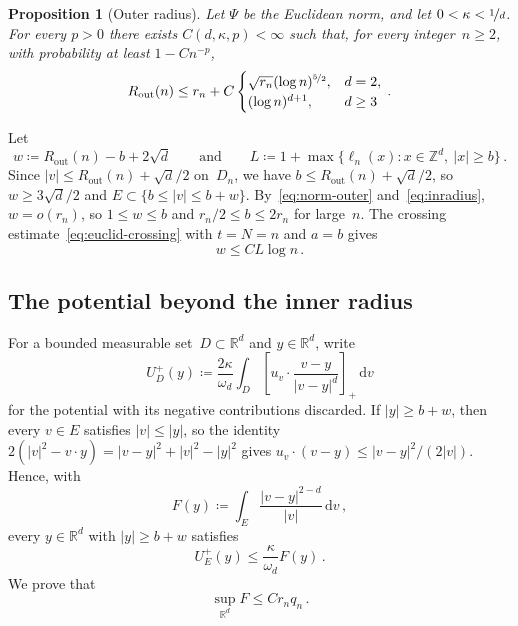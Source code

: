 \documentclass[11pt]{amsart}
\theoremstyle{plain}
\newtheorem{proposition}[theorem]{Proposition}
\theoremstyle{definition}
\newcommand{\Z}{\mathbb Z}
\newcommand{\R}{\mathbb R}
\newcommand{\drift}{\kappa}
\newcommand{\gauge}{\Psi}
\newcommand{\dd}{\,\mathrm d}
\newcommand{\nf}{\nicefrac}
\newcommand{\Rout}{R_{\mathrm{out}}}
\numberwithin{equation}{section}
\begin{document}
\begin{proposition}[Outer radius]\label{prop:stronger-outer}
Let $\gauge$ be the Euclidean norm, and let $0<\drift<\nf{1}{d}$. For every $p>0$ there exists $C(d,\drift,p)<\infty$ such that, for every integer~$n\geq2$, with probability at least $1-Cn^{-p}$,
\begin{equation*}
\Rout(n)\leq r_n+C\begin{cases}\sqrt{r_n}(\log n)^{\nf52},&d=2,\\(\log n)^{d+1},&d\geq3\end{cases}\, .
\end{equation*}
\end{proposition}

Let
\begin{equation*}
w\coloneqq\Rout(n)-b+2\sqrt d
\qquad\text{and}\qquad
L\coloneqq1+\max\{\ell_n(x):x\in\Z^d,\ |x|\geq b\}\, .
\end{equation*}
Since $|v|\leq\Rout(n)+\sqrt d/2$ on~$D_n$, we have $b\leq\Rout(n)+\sqrt d/2$, so $w\geq3\sqrt d/2$ and $E\subset\{b\leq|v|\leq b+w\}$. By~\eqref{eq:norm-outer} and~\eqref{eq:inradius}, $w=o(r_n)$, so $1\leq w\leq b$ and $r_n/2\leq b\leq2r_n$ for large~$n$. The crossing estimate~\eqref{eq:euclid-crossing} with $t=N=n$ and $a=b$ gives
\begin{equation}\label{eq:outer-width-occupation}
w\leq CL\log n\, .
\end{equation}

\subsection{The potential beyond the inner radius}\label{sec:outer-potential}

For a bounded measurable set~$D\subset\R^d$ and $y\in\R^d$, write
\begin{equation*}
U_D^+(y)\coloneqq\frac{2\drift}{\omega_d}\int_D\left[u_v\cdot\frac{v-y}{|v-y|^d}\right]_+\dd v
\end{equation*}
for the potential with its negative contributions discarded. If $|y|\geq b+w$, then every $v\in E$ satisfies $|v|\leq|y|$, so the identity $2(|v|^2-v\cdot y)=|v-y|^2+|v|^2-|y|^2$ gives $u_v\cdot(v-y)\leq|v-y|^2/(2|v|)$. Hence, with
\begin{equation*}
F(y)\coloneqq\int_E\frac{|v-y|^{2-d}}{|v|}\dd v\, ,
\end{equation*}
every $y\in\R^d$ with $|y|\geq b+w$ satisfies
\begin{equation}\label{eq:curvature-size}
U_E^+(y)\leq\frac\drift{\omega_d}F(y)\, .
\end{equation}
We prove that
\begin{equation}\label{eq:curvature-improved}
\sup_{\R^d}F\leq Cr_nq_n\, .
\end{equation}
\end{document}
